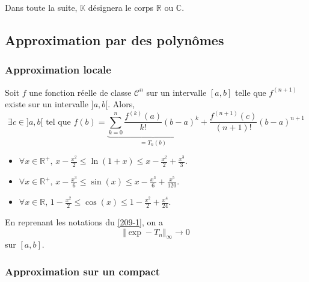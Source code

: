 




  Dans toute la suite, $\mathbb{K}$ désignera le corps $\mathbb{R}$ ou $\mathbb{C}$.

  \subsection{Approximation par des polynômes}

  \subsubsection{Approximation locale}


  \begin{theorem}
    \label{209-1}
    Soit $f$ une fonction réelle de classe $\mathcal{C}^n$ sur un intervalle $[a,b]$ telle que $f^{(n+1)}$ existe sur un intervalle $]a,b[$. Alors,
    \[ \exists c \in ]a,b[ \text{ tel que } f(b) = \underbrace{\sum_{k=0}^{n} \frac{f^{(k)} (a)}{k!} (b-a)^k}_{= T_n(b)} + \frac{f^{(n+1)}(c)}{(n+1)!} (b-a)^{n+1} \]
  \end{theorem}

  \begin{application}
    \begin{itemize}
      \item $\forall x \in \mathbb{R}^+, \, x - \frac{x^2}{2} \leq \ln(1+x) \leq x - \frac{x^2}{2} + \frac{x^3}{3}$.
      \item $\forall x \in \mathbb{R}^+, \, x - \frac{x^3}{6} \leq \sin(x) \leq x - \frac{x^3}{6} + \frac{x^5}{120}$.
      \item $\forall x \in \mathbb{R}, \, 1 - \frac{x^2}{2} \leq \cos(x) \leq 1 - \frac{x^2}{2} + \frac{x^4}{24}$.
    \end{itemize}
  \end{application}

  \begin{proposition}
    En reprenant les notations du \cref{209-1}, on a
    \[ \Vert \exp - T_n \Vert_\infty \longrightarrow 0 \]
    sur $[a,b]$.
  \end{proposition}

  \subsubsection{Approximation sur un compact}

